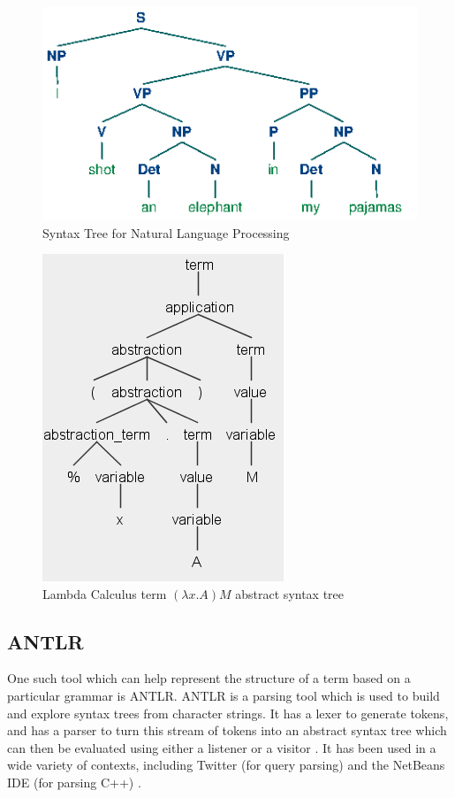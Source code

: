 \documentclass[a4paper,11pt]{report}
\begin{document}
\begin{figure}[p]
	\centering
	\includegraphics[scale=0.75]{images/nlp_tree}
	\caption{Syntax Tree for Natural Language Processing \protect\cite{Bird2009}}
	\label{nlp_tree}
\end{figure}

\begin{figure}[p]
	\centering
	\includegraphics[scale=0.75]{images/abstract_syntax_tree}
	\caption{Lambda Calculus term $(\lambda x.A)M$ abstract syntax tree}
	\label{abstract_syntax_tree}
\end{figure}


\subsection{ANTLR}

One such tool which can help represent the structure of a term based on a particular grammar is ANTLR. ANTLR is a parsing tool which is used to build and explore syntax trees from character strings. It has a lexer to generate tokens, and has a parser to turn this stream of tokens into an abstract syntax tree which can then be evaluated using either a listener or a visitor \cite{Parr2012}. It has been used in a wide variety of contexts, including Twitter (for query parsing) and the NetBeans IDE (for parsing C++) \cite{Parr2012}. %
\end{document}
